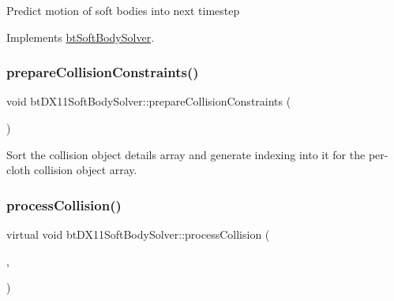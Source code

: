 Predict motion of soft bodies into next timestep 

Implements \hyperlink{classbtSoftBodySolver_a72f0c095ae30002a6f98fc194a63e1ba}{bt\+Soft\+Body\+Solver}.

\mbox{\label{classbtDX11SoftBodySolver_a887cc48c63b010cd511e11ce11ea6acd}} 
\subsubsection{\texorpdfstring{prepare\+Collision\+Constraints()}{prepareCollisionConstraints()}}
{\footnotesize\ttfamily void bt\+D\+X11\+Soft\+Body\+Solver\+::prepare\+Collision\+Constraints (\begin{DoxyParamCaption}{ }\end{DoxyParamCaption})\hspace{0.3cm}{\ttfamily [protected]}}

Sort the collision object details array and generate indexing into it for the per-\/cloth collision object array. \mbox{\label{classbtDX11SoftBodySolver_af49d469304c58ed901182915915aee64}} 
\subsubsection{\texorpdfstring{process\+Collision()}{processCollision()}\hspace{0.1cm}{\footnotesize\ttfamily [1/2]}}
{\footnotesize\ttfamily virtual void bt\+D\+X11\+Soft\+Body\+Solver\+::process\+Collision (\begin{DoxyParamCaption}\item[{\hyperlink{classbtSoftBody}{bt\+Soft\+Body} $\ast$}]{,  }\item[{\hyperlink{classbtSoftBody}{bt\+Soft\+Body} $\ast$}]{ }\end{DoxyParamCaption})\hspace{0.3cm}{\ttfamily [virtual]}}

